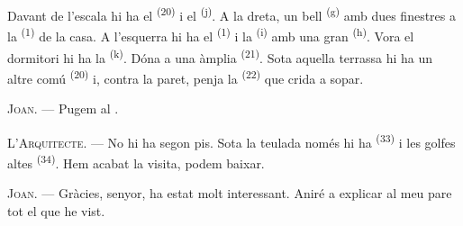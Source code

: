 \VUsaut{3.0mm}
\VUsaut{3.0mm}

Davant de l'escala hi ha el  \textsuperscript{(20)} i el
 \textsuperscript{(j)}. A la dreta, un bell 
\textsuperscript{(g)} amb dues finestres a la  \textsuperscript{(1)} de la
casa. A l'esquerra hi ha el  \textsuperscript{(1)} i la 
\textsuperscript{(i)} amb una gran  \textsuperscript{(h)}. Vora el dormitori hi
ha la
 \textsuperscript{(k)}. Dóna a una àmplia
 \textsuperscript{(21)}. Sota aquella terrassa hi ha un altre
comú \textsuperscript{(20)} i, contra la paret, penja la 
\textsuperscript{(22)} que crida a sopar.

\textsc{Joan}. --- Pugem al .

\textsc{L'Arquitecte}. --- No hi ha segon pis. Sota la teulada només hi ha
 \textsuperscript{(33)} i les golfes altes
\textsuperscript{(34)}. Hem acabat la visita, podem baixar.

\textsc{Joan}. --- Gràcies, senyor, ha estat molt interessant. Aniré a explicar al meu pare
tot el que he vist.
\VUsaut{4.0mm}
\VUfilet{22mm}
